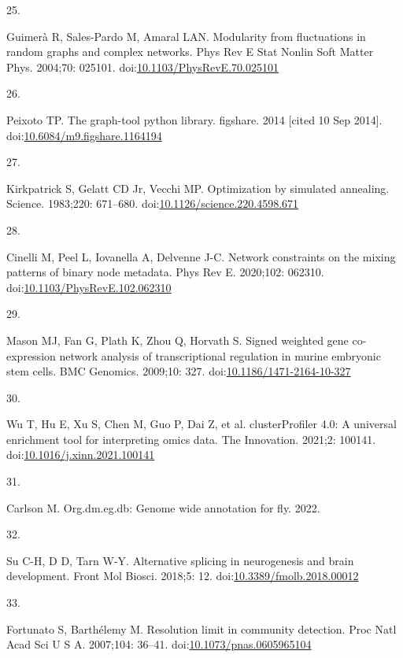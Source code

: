 \documentclass[
]{article}
\newlength{\cslhangindent}
\newlength{\csllabelwidth}
\newenvironment{CSLReferences}[2] %
 {\begin{list}{}{%
  \setlength{\itemindent}{0pt}
  \setlength{\leftmargin}{0pt}
  \setlength{\parsep}{0pt}
  \ifodd #1
   \setlength{\leftmargin}{\cslhangindent}
   \setlength{\itemindent}{-1\cslhangindent}
  \fi
  \setlength{\itemsep}{#2\baselineskip}}}
 {\end{list}}
\newcommand{\CSLLeftMargin}[1]{\parbox[t]{\csllabelwidth}{\strut#1\strut}}
\newcommand{\CSLRightInline}[1]{\parbox[t]{\linewidth - \csllabelwidth}{\strut#1\strut}}
\begin{document}
\begin{CSLReferences}{0}{1}
\CSLLeftMargin{25. }%
\CSLRightInline{Guimerà R, Sales-Pardo M, Amaral LAN. Modularity from
fluctuations in random graphs and complex networks. Phys Rev E Stat
Nonlin Soft Matter Phys. 2004;70: 025101.
doi:\href{https://doi.org/10.1103/PhysRevE.70.025101}{10.1103/PhysRevE.70.025101}}

\CSLLeftMargin{26. }%
\CSLRightInline{Peixoto TP. The graph-tool python library. figshare.
2014 {[}cited 10 Sep 2014{]}.
doi:\href{https://doi.org/10.6084/m9.figshare.1164194}{10.6084/m9.figshare.1164194}}

\CSLLeftMargin{27. }%
\CSLRightInline{Kirkpatrick S, Gelatt CD Jr, Vecchi MP. Optimization by
simulated annealing. Science. 1983;220: 671--680.
doi:\href{https://doi.org/10.1126/science.220.4598.671}{10.1126/science.220.4598.671}}

\CSLLeftMargin{28. }%
\CSLRightInline{Cinelli M, Peel L, Iovanella A, Delvenne J-C. Network
constraints on the mixing patterns of binary node metadata. Phys Rev E.
2020;102: 062310.
doi:\href{https://doi.org/10.1103/PhysRevE.102.062310}{10.1103/PhysRevE.102.062310}}

\CSLLeftMargin{29. }%
\CSLRightInline{Mason MJ, Fan G, Plath K, Zhou Q, Horvath S. Signed
weighted gene co-expression network analysis of transcriptional
regulation in murine embryonic stem cells. BMC Genomics. 2009;10: 327.
doi:\href{https://doi.org/10.1186/1471-2164-10-327}{10.1186/1471-2164-10-327}}

\CSLLeftMargin{30. }%
\CSLRightInline{Wu T, Hu E, Xu S, Chen M, Guo P, Dai Z, et al.
clusterProfiler 4.0: A universal enrichment tool for interpreting omics
data. The Innovation. 2021;2: 100141.
doi:\href{https://doi.org/10.1016/j.xinn.2021.100141}{10.1016/j.xinn.2021.100141}}

\CSLLeftMargin{31. }%
\CSLRightInline{Carlson M. Org.dm.eg.db: Genome wide annotation for fly.
2022. }

\CSLLeftMargin{32. }%
\CSLRightInline{Su C-H, D D, Tarn W-Y. Alternative splicing in
neurogenesis and brain development. Front Mol Biosci. 2018;5: 12.
doi:\href{https://doi.org/10.3389/fmolb.2018.00012}{10.3389/fmolb.2018.00012}}

\CSLLeftMargin{33. }%
\CSLRightInline{Fortunato S, Barthélemy M. Resolution limit in community
detection. Proc Natl Acad Sci U S A. 2007;104: 36--41.
doi:\href{https://doi.org/10.1073/pnas.0605965104}{10.1073/pnas.0605965104}}


\end{CSLReferences}
\end{document}
